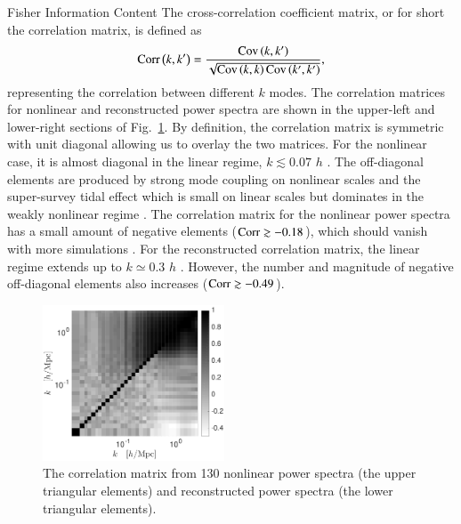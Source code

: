 \begin{section}{Fisher Information Content}
  The cross-correlation coefficient matrix, or for short the correlation matrix, 
  is defined as 
  \begin{align}
    \mathrm{\textcolor{black}{\boldsymbol{Corr}}}\left(k,k'\right)=\frac{\mathrm{\textcolor{black}{\boldsymbol{Cov}}}\left(k,k'\right)}
    {\sqrt{\mathrm{\textcolor{black}{\boldsymbol{Cov}}}\left(k,k\right)\mathrm{\textcolor{black}{\boldsymbol{Cov}}}\left(k',k'\right)}},
  \end{align}
  representing the correlation between different $k$ modes.  The
  correlation matrices for nonlinear and reconstructed power spectra
  are shown in the upper-left and lower-right sections of Fig.~\ref{fig:corrall}.
  By definition, the correlation matrix is symmetric with unit
  diagonal allowing us to overlay the two matrices.  For the
  nonlinear case, it is almost diagonal in the linear
  regime, $k \lesssim 0.07$ $h$ .  The off-diagonal
  elements are produced by strong mode coupling on nonlinear scales
  and the super-survey tidal effect which is small on linear scales
  but dominates in the weakly nonlinear regime
  \citep{bib:Kazuyuki2016}.  The correlation matrix for the nonlinear
  power spectra has a small amount of negative elements
  ($\mathrm{\textcolor{black}{\boldsymbol{Corr}}} \gtrsim -0.18$), which should vanish with more
  simulations \citep{bib:Takahashi2009}.  For the reconstructed
  correlation matrix, the linear regime extends up to $k \simeq 0.3$
  $h$ .  However, the number and magnitude of negative off-diagonal elements
  also increases ($\mathrm{\textcolor{black}{\boldsymbol{Corr}}} \gtrsim -0.49$).

  \begin{figure}
    \centering
    \includegraphics[width=0.48\textwidth]{fig3.pdf}
    \caption{The correlation matrix from 130 nonlinear power
      spectra (the upper triangular elements) and reconstructed power
      spectra (the lower triangular elements).}
    \label{fig:corrall}
  \end{figure}


\end{section}
